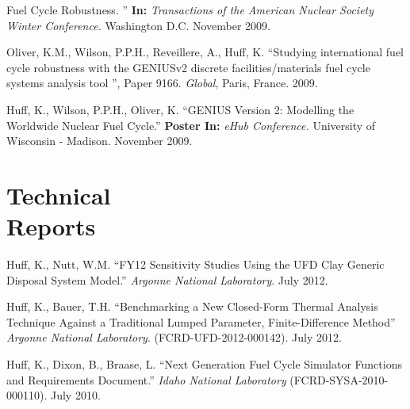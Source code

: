 \documentclass[margin,line]{resume}
\begin{document}
\begin{resume}
\begin{bibenum}
        Fuel Cycle Robustness. ''
        \textbf{In: } \emph{Transactions of the American Nuclear Society Winter Conference.} 
        Washington D.C. November 2009. 
      \item Oliver, K.M., Wilson, P.P.H., Reveillere, A., Huff, K. ``Studying 
          international fuel cycle robustness with the GENIUSv2 discrete 
          facilities/materials fuel cycle systems analysis tool	'', Paper 9166. 
          \textsl{Global}, Paris, France. 2009.
      \item Huff, K., Wilson, P.P.H., Oliver, K. ``GENIUS Version 2: Modelling the Worldwide Nuclear Fuel Cycle.'' 
        \textbf{Poster In: } \emph{eHub Conference.} University of Wisconsin - 
        Madison. November 2009.
    \end{bibenum}

    \section{\mysidestyle Technical\\Reports}
    \begin{bibenum}
      \item Huff, K., Nutt, W.M. ``FY12 Sensitivity Studies Using the UFD Clay Generic Disposal System Model.'' 
        \emph{Argonne National Laboratory}. July 2012.
      \item Huff, K., Bauer, T.H. ``Benchmarking a New Closed-Form Thermal Analysis Technique Against a Traditional
        Lumped Parameter, Finite-Difference Method'' \emph{Argonne National Laboratory}. (FCRD-UFD-2012-000142). July 2012.
      \item Huff, K., Dixon, B., Braase, L. ``Next Generation Fuel Cycle Simulator Functions and Requirements Document.'' 
        \emph{Idaho National Laboratory} (FCRD-SYSA-2010-000110). July 2010. 
    \end{bibenum}

\end{resume}
\end{document}
